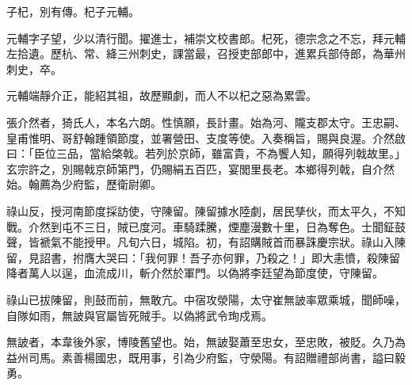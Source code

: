 \begin{pinyinscope}
 子杞，別有傳。杞子元輔。



 元輔字子望，少以清行聞。擢進士，補崇文校書郎。杞死，德宗念之不忘，拜元輔左拾遺。歷杭、常、絳三州刺史，課當最，召授吏部郎中，進累兵部侍郎，為華州刺史，卒。



 元輔端靜介正，能紹其祖，故歷顯劇，而人不以杞之惡為累雲。



 張介然者，猗氏人，本名六朗。性慎願，長計畫。始為河、隴支郡太守。王忠嗣、皇甫惟明、哥舒翰踵領節度，並署營田、支度等使。入奏稱旨，賜與良渥。介然啟曰：「臣位三品，當給棨戟。若列於京師，雖富貴，不為饗人知，願得列戟故里。」玄宗許之，別賜戟京師第門，仍賜絹五百匹，宴閭里長老。本鄉得列戟，自介然始。翰薦為少府監，歷衛尉卿。



 祿山反，授河南節度採訪使，守陳留。陳留據水陸劇，居民孳伙，而太平久，不知戰。介然到屯不三日，賊已度河。車騎蹂騰，煙塵漫數十里，日為奪色。士聞鉦鼓聲，皆褫氣不能授甲。凡旬六日，城陷。初，有詔購賊首而暴誅慶宗狀。祿山入陳留，見詔書，拊膺大哭曰：「我何罪！吾子亦何罪，乃殺之！」即大恚憤，殺陳留降者萬人以逞，血流成川，斬介然於軍門。以偽將李廷望為節度使，守陳留。



 祿山已拔陳留，則鼓而前，無敢亢。中宿攻滎陽，太守崔無詖率眾乘城，聞師噪，自隊如雨，無詖與官屬皆死賊手。以偽將武令珣戍焉。



 無詖者，本韋後外家，博陵舊望也。始，無詖娶蕭至忠女，至忠敗，被貶。久乃為益州司馬。素善楊國忠，既用事，引為少府監，守滎陽。有詔贈禮部尚書，謚曰毅勇。



\end{pinyinscope}